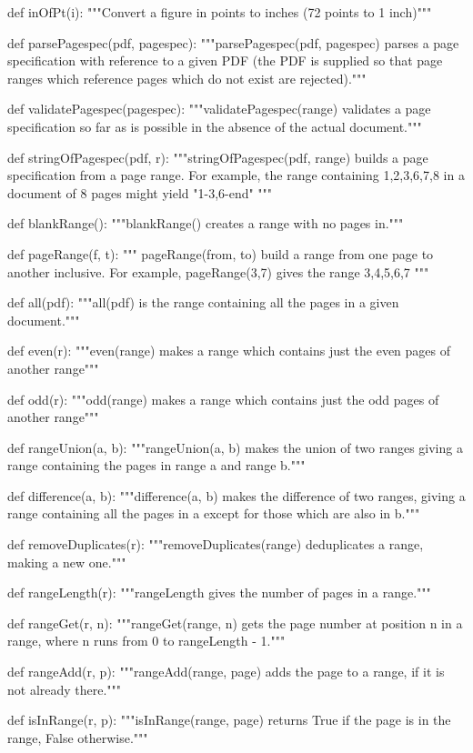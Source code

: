 def inOfPt(i):
    """Convert a figure in points to inches (72 points to 1 inch)"""

def parsePagespec(pdf, pagespec):
    """parsePagespec(pdf, pagespec) parses a page specification with reference to
    a given PDF (the PDF is supplied so that page ranges which reference pages
    which do not exist are rejected)."""

def validatePagespec(pagespec):
    """validatePagespec(range) validates a page specification so far as is
    possible in the absence of the actual document."""

def stringOfPagespec(pdf, r):
    """stringOfPagespec(pdf, range) builds a page specification from a page
    range. For example, the range containing 1,2,3,6,7,8 in a document of 8
    pages might yield "1-3,6-end" """

def blankRange():
    """blankRange() creates a range with no pages in."""

def pageRange(f, t):
    """ pageRange(from, to) build a range from one page to another inclusive.
    For example, pageRange(3,7) gives the range 3,4,5,6,7 """

def all(pdf):
    """all(pdf) is the range containing all the pages in a given document."""

def even(r):
    """even(range) makes a range which contains just the even pages of another
    range"""

def odd(r):
    """odd(range) makes a range which contains just the odd pages of another
    range"""

def rangeUnion(a, b):
    """rangeUnion(a, b) makes the union of two ranges giving a range containing
    the pages in range a and range b."""

def difference(a, b):
    """difference(a, b) makes the difference of two ranges, giving a range
    containing all the pages in a except for those which are also in b."""

def removeDuplicates(r):
    """removeDuplicates(range) deduplicates a range, making a new one."""

def rangeLength(r):
    """rangeLength gives the number of pages in a range."""

def rangeGet(r, n):
    """rangeGet(range, n) gets the page number at position n in a range, where
    n runs from 0 to rangeLength - 1."""

def rangeAdd(r, p):
    """rangeAdd(range, page) adds the page to a range, if it is not already
    there."""

def isInRange(r, p):
    """isInRange(range, page) returns True if the page is in the range, False
    otherwise."""

